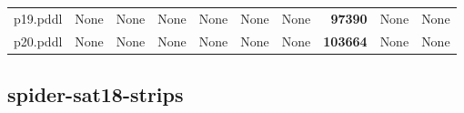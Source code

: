 \documentclass{article}
\begin{document}
\begin{tabular}{@{}lrrrrrrrrr@{}}
p19.pddl & \multicolumn{1}{|l|}{None} & \multicolumn{1}{|l|}{None} & \multicolumn{1}{|l|}{None} & \multicolumn{1}{|l|}{None} & \multicolumn{1}{|l|}{None} & \multicolumn{1}{|l|}{None} & \textbf{97390} & \multicolumn{1}{|l|}{None} & \multicolumn{1}{|l|}{None} \\
p20.pddl & \multicolumn{1}{|l|}{None} & \multicolumn{1}{|l|}{None} & \multicolumn{1}{|l|}{None} & \multicolumn{1}{|l|}{None} & \multicolumn{1}{|l|}{None} & \multicolumn{1}{|l|}{None} & \textbf{103664} & \multicolumn{1}{|l|}{None} & \multicolumn{1}{|l|}{None} \\
\end{tabular}

\hypertarget{operators-spider-sat18-strips}{}
\subsection*{spider-sat18-strips}
\end{document}
